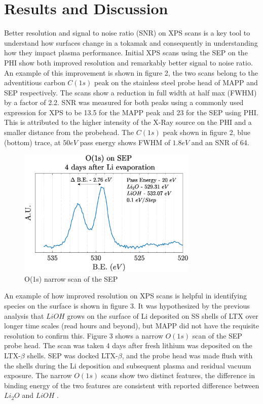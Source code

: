 \documentclass[aip,rsi,amsmath,amssymb,reprint]{revtex4-1}
\begin{document}
\section{Results and Discussion}

Better resolution and signal to noise ratio (SNR) on XPS scans is a key tool to understand how surfaces change in a tokamak and consequently in understanding how they impact plasma performance. Initial XPS scans using the SEP on the PHI show both improved resolution and remarkably better signal to noise ratio. An example of this improvement is shown in figure 2, the two scans belong to the adventitious carbon $C(1s)$ peak on the stainless steel probe head of MAPP and SEP respectively. The scans show a reduction in full width at half max (FWHM) by a factor of 2.2. SNR was measured for both peaks using a commonly used expression for XPS \cite{xps_snr} to be 13.5 for the MAPP peak and 23 for the SEP using PHI. This is attributed to the higher intensity of the X-Ray source on the PHI and a smaller distance from the probehead. The $C(1s)$ peak shown in figure 2, blue (bottom) trace, at $50 eV$ pass energy shows FWHM of $1.8eV$ and an SNR of 64. 

\begin{figure}%
\centering
\includegraphics[width=3.37in,keepaspectratio]{O1s_20eV}%
\caption{O(1s) narrow scan of the SEP }
\end{figure}

An example of how improved resolution on XPS scans is helpful in identifying species on the surface is shown in figure 3. It was hypothesized by the previous analysis that $LiOH$ grows on the surface of Li deposited on SS shells of LTX over longer time scales (read hours and beyond), but MAPP did not have the requisite resolution to confirm this. Figure 3 shows a narrow $O(1s)$ scan of the SEP probe head. The scan was taken 4 days after fresh lithium was deposited on the LTX-$\beta$ shells. SEP was docked LTX-$\beta$, and the probe head was made flush with the shells during the Li deposition and subsequent plasma and residual vacuum exposure. The narrow $O(1s)$ scans show two distinct features, the difference in binding energy of the two features are consistent with reported difference between $Li_2O$ and $LiOH$ \cite{o1s_delta}. 
\end{document}
